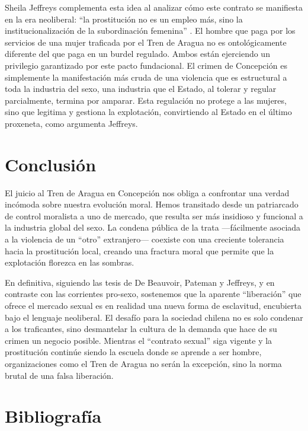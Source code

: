 \documentclass[12pt, a4paper]{article}
\begin{document}
Sheila Jeffreys complementa esta idea al analizar cómo este contrato se manifiesta en la era neoliberal: ``la prostitución no es un empleo más, sino la institucionalización de la subordinación femenina'' \cite{jeffreys}. El hombre que paga por los servicios de una mujer traficada por el Tren de Aragua no es ontológicamente diferente del que paga en un burdel regulado. Ambos están ejerciendo un privilegio garantizado por este pacto fundacional. El crimen de Concepción es simplemente la manifestación más cruda de una violencia que es estructural a toda la industria del sexo, una industria que el Estado, al tolerar y regular parcialmente, termina por amparar. Esta regulación no protege a las mujeres, sino que legitima y gestiona la explotación, convirtiendo al Estado en el último proxeneta, como argumenta Jeffreys.

\newpage
\section*{Conclusión}

El juicio al Tren de Aragua en Concepción nos obliga a confrontar una verdad incómoda sobre nuestra evolución moral. Hemos transitado desde un patriarcado de control moralista a uno de mercado, que resulta ser más insidioso y funcional a la industria global del sexo. La condena pública de la trata —fácilmente asociada a la violencia de un ``otro'' extranjero— coexiste con una creciente tolerancia hacia la prostitución local, creando una fractura moral que permite que la explotación florezca en las sombras.

En definitiva, siguiendo las tesis de De Beauvoir, Pateman y Jeffreys, y en contraste con las corrientes pro-sexo, sostenemos que la aparente ``liberación'' que ofrece el mercado sexual es en realidad una nueva forma de esclavitud, encubierta bajo el lenguaje neoliberal. El desafío para la sociedad chilena no es solo condenar a los traficantes, sino desmantelar la cultura de la demanda que hace de su crimen un negocio posible. Mientras el ``contrato sexual'' siga vigente y la prostitución continúe siendo la escuela donde se aprende a ser hombre, organizaciones como el Tren de Aragua no serán la excepción, sino la norma brutal de una falsa liberación.

\newpage
\section*{Bibliografía}
\renewcommand{\refname}{Referencias}
\end{document}
